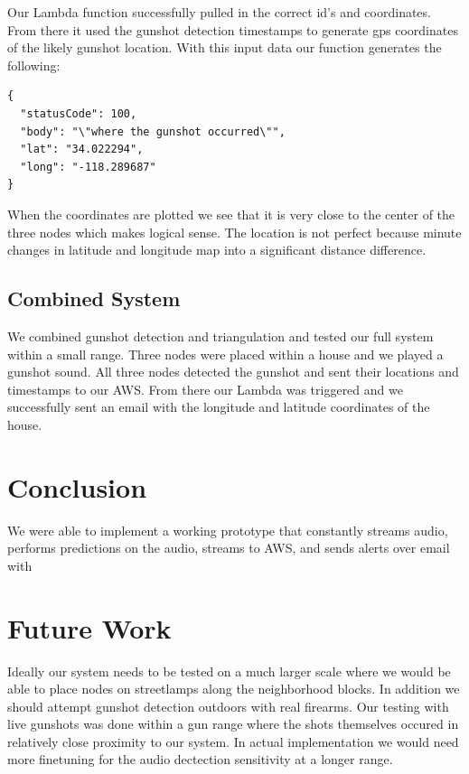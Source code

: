 \documentclass[conference]{IEEEtran}
\begin{document}
Our Lambda function successfully pulled in the  correct id's and coordinates. From there it used the gunshot detection timestamps to generate gps coordinates of the likely gunshot location. With this input data our function generates the following:


\begin{small}
\begin{verbatim}
{
  "statusCode": 100,
  "body": "\"where the gunshot occurred\"",
  "lat": "34.022294",
  "long": "-118.289687"
}
\end{verbatim}
\end{small}

When the coordinates are plotted we see that it is very close to the center of the three nodes which makes logical sense. The location is not perfect because minute changes in latitude and longitude map into a significant distance difference.

\subsection{Combined System}
We combined gunshot detection and triangulation and tested our full system within a small range. Three nodes were placed within a house and we played a gunshot sound. All three nodes detected the gunshot and sent their locations and timestamps to our AWS. From there our Lambda was triggered and we successfully sent an email with the longitude and latitude coordinates of the house.

\section{Conclusion}
We were able to implement a working prototype that constantly streams audio, performs predictions on the audio, streams to AWS, and sends alerts over email with 
\section{Future Work}
Ideally our system needs to be tested on a much larger scale where we would be able to place nodes on streetlamps along the neighborhood blocks. In addition we should attempt gunshot detection outdoors with real firearms. Our testing with live gunshots was done within a gun range where the shots themselves occured in relatively close proximity to our system. In actual implementation we would need more finetuning for the audio dectection sensitivity at a longer range.
\end{document}
